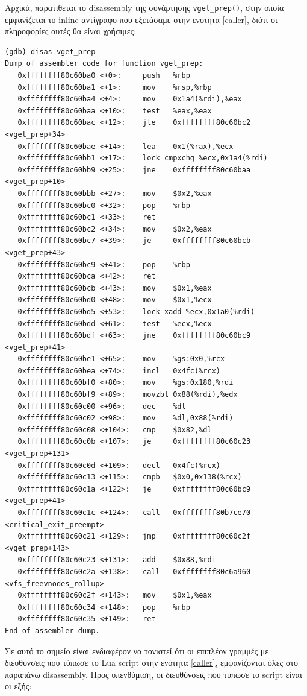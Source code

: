 \documentclass[12pt]{article}
\begin{document}
Αρχικά, παρατίθεται το disassembly της συνάρτησης \lstinline{vget_prep()}, στην
οποία εμφανίζεται το inline αντίγραφο που εξετάσαμε στην ενότητα \ref{caller},
διότι οι πληροφορίες αυτές θα είναι χρήσιμες:

\begin{lstlisting}
(gdb) disas vget_prep
Dump of assembler code for function vget_prep:
   0xffffffff80c60ba0 <+0>:     push   %rbp
   0xffffffff80c60ba1 <+1>:     mov    %rsp,%rbp
   0xffffffff80c60ba4 <+4>:     mov    0x1a4(%rdi),%eax
   0xffffffff80c60baa <+10>:    test   %eax,%eax
   0xffffffff80c60bac <+12>:    jle    0xffffffff80c60bc2 <vget_prep+34>
   0xffffffff80c60bae <+14>:    lea    0x1(%rax),%ecx
   0xffffffff80c60bb1 <+17>:    lock cmpxchg %ecx,0x1a4(%rdi)
   0xffffffff80c60bb9 <+25>:    jne    0xffffffff80c60baa <vget_prep+10>
   0xffffffff80c60bbb <+27>:    mov    $0x2,%eax
   0xffffffff80c60bc0 <+32>:    pop    %rbp
   0xffffffff80c60bc1 <+33>:    ret
   0xffffffff80c60bc2 <+34>:    mov    $0x2,%eax
   0xffffffff80c60bc7 <+39>:    je     0xffffffff80c60bcb <vget_prep+43>
   0xffffffff80c60bc9 <+41>:    pop    %rbp
   0xffffffff80c60bca <+42>:    ret
   0xffffffff80c60bcb <+43>:    mov    $0x1,%eax
   0xffffffff80c60bd0 <+48>:    mov    $0x1,%ecx
   0xffffffff80c60bd5 <+53>:    lock xadd %ecx,0x1a0(%rdi)
   0xffffffff80c60bdd <+61>:    test   %ecx,%ecx
   0xffffffff80c60bdf <+63>:    jne    0xffffffff80c60bc9 <vget_prep+41>
   0xffffffff80c60be1 <+65>:    mov    %gs:0x0,%rcx
   0xffffffff80c60bea <+74>:    incl   0x4fc(%rcx)
   0xffffffff80c60bf0 <+80>:    mov    %gs:0x180,%rdi
   0xffffffff80c60bf9 <+89>:    movzbl 0x88(%rdi),%edx
   0xffffffff80c60c00 <+96>:    dec    %dl
   0xffffffff80c60c02 <+98>:    mov    %dl,0x88(%rdi)
   0xffffffff80c60c08 <+104>:   cmp    $0x82,%dl
   0xffffffff80c60c0b <+107>:   je     0xffffffff80c60c23 <vget_prep+131>
   0xffffffff80c60c0d <+109>:   decl   0x4fc(%rcx)
   0xffffffff80c60c13 <+115>:   cmpb   $0x0,0x138(%rcx)
   0xffffffff80c60c1a <+122>:   je     0xffffffff80c60bc9 <vget_prep+41>
   0xffffffff80c60c1c <+124>:   call   0xffffffff80b7ce70 <critical_exit_preempt>
   0xffffffff80c60c21 <+129>:   jmp    0xffffffff80c60c2f <vget_prep+143>
   0xffffffff80c60c23 <+131>:   add    $0x88,%rdi
   0xffffffff80c60c2a <+138>:   call   0xffffffff80c6a960 <vfs_freevnodes_rollup>
   0xffffffff80c60c2f <+143>:   mov    $0x1,%eax
   0xffffffff80c60c34 <+148>:   pop    %rbp
   0xffffffff80c60c35 <+149>:   ret
End of assembler dump.
\end{lstlisting}

Σε αυτό το σημείο είναι ενδιαφέρον να τονιστεί ότι οι επιπλέον γραμμές με
διευθύνσεις που τύπωσε το Lua script στην ενότητα \ref{caller}, εμφανίζονται
όλες στο παραπάνω disassembly. Προς υπενθύμιση, οι διευθύνσεις που τύπωσε το
script είναι οι εξής:
\end{document}
